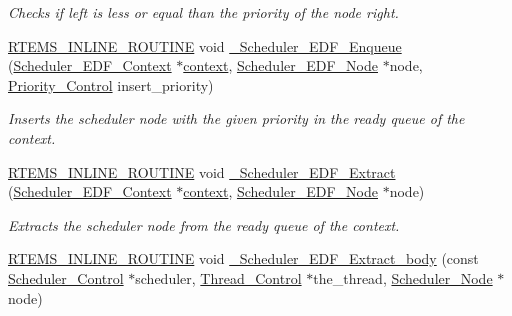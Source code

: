 \begin{DoxyCompactItemize}
\begin{DoxyCompactList}\small\item\em Checks if {\itshape left} is less or equal than the priority of the node {\itshape right}. \end{DoxyCompactList}\item 
\mbox{\hyperlink{group__RTEMSScoreBaseDefs_gac216239df231d5dbd15e3520b0b9313f}{R\+T\+E\+M\+S\+\_\+\+I\+N\+L\+I\+N\+E\+\_\+\+R\+O\+U\+T\+I\+NE}} void \mbox{\hyperlink{group__RTEMSScoreSchedulerEDF_gad3aeb60cde6231ec6baee6649b09d9b5}{\+\_\+\+Scheduler\+\_\+\+E\+D\+F\+\_\+\+Enqueue}} (\mbox{\hyperlink{structScheduler__EDF__Context}{Scheduler\+\_\+\+E\+D\+F\+\_\+\+Context}} $\ast$\mbox{\hyperlink{sun4u_2tte_8h_a9b4a99475e2709333b8e5d70483173f1}{context}}, \mbox{\hyperlink{structScheduler__EDF__Node}{Scheduler\+\_\+\+E\+D\+F\+\_\+\+Node}} $\ast$node, \mbox{\hyperlink{group__RTEMSScorePriority_ga59d02b58072d31a9a1cfe644557aefe2}{Priority\+\_\+\+Control}} insert\+\_\+priority)
\begin{DoxyCompactList}\small\item\em Inserts the scheduler node with the given priority in the ready queue of the context. \end{DoxyCompactList}\item 
\mbox{\hyperlink{group__RTEMSScoreBaseDefs_gac216239df231d5dbd15e3520b0b9313f}{R\+T\+E\+M\+S\+\_\+\+I\+N\+L\+I\+N\+E\+\_\+\+R\+O\+U\+T\+I\+NE}} void \mbox{\hyperlink{group__RTEMSScoreSchedulerEDF_ga3b25999c8ed803d5e2cebce7ad1b2060}{\+\_\+\+Scheduler\+\_\+\+E\+D\+F\+\_\+\+Extract}} (\mbox{\hyperlink{structScheduler__EDF__Context}{Scheduler\+\_\+\+E\+D\+F\+\_\+\+Context}} $\ast$\mbox{\hyperlink{sun4u_2tte_8h_a9b4a99475e2709333b8e5d70483173f1}{context}}, \mbox{\hyperlink{structScheduler__EDF__Node}{Scheduler\+\_\+\+E\+D\+F\+\_\+\+Node}} $\ast$node)
\begin{DoxyCompactList}\small\item\em Extracts the scheduler node from the ready queue of the context. \end{DoxyCompactList}\item 
\mbox{\hyperlink{group__RTEMSScoreBaseDefs_gac216239df231d5dbd15e3520b0b9313f}{R\+T\+E\+M\+S\+\_\+\+I\+N\+L\+I\+N\+E\+\_\+\+R\+O\+U\+T\+I\+NE}} void \mbox{\hyperlink{group__RTEMSScoreSchedulerEDF_ga0daebfc9b131bd097db9899942bb0926}{\+\_\+\+Scheduler\+\_\+\+E\+D\+F\+\_\+\+Extract\+\_\+body}} (const \mbox{\hyperlink{struct__Scheduler__Control}{Scheduler\+\_\+\+Control}} $\ast$scheduler, \mbox{\hyperlink{struct__Thread__Control}{Thread\+\_\+\+Control}} $\ast$the\+\_\+thread, \mbox{\hyperlink{structScheduler__Node}{Scheduler\+\_\+\+Node}} $\ast$node)

\end{DoxyCompactItemize}
